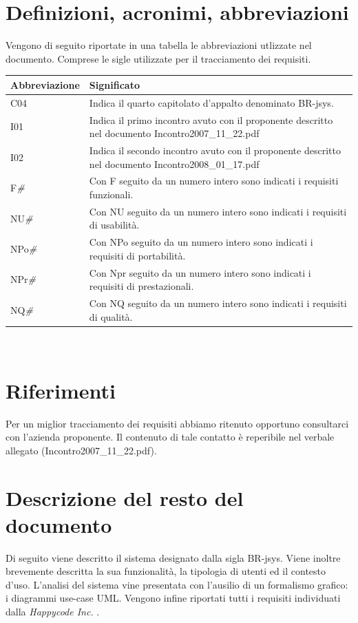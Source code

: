 \documentclass[11pt,titlepage,a4paper]{report}
\begin{document}
\section{Definizioni, acronimi, abbreviazioni}
Vengono di seguito riportate in una tabella le abbreviazioni utlizzate nel documento. Comprese le sigle utilizzate per il tracciamento dei requisiti.
\begin{center}
\begin{tabular}{||p{3.5cm}||p{9.5cm}||} \hline
\textbf{Abbreviazione} & \textbf{Significato} \\ \hline
C04 & Indica il quarto capitolato d'appalto denominato BR-jsys.\\ \hline
I01 & Indica il primo incontro avuto con il proponente descritto nel documento Incontro2007\_11\_22.pdf\\ \hline
I02 & Indica il secondo incontro avuto con il proponente descritto nel documento Incontro2008\_01\_17.pdf\\ \hline
F\textit{\#} & Con F seguito da un numero intero sono indicati i requisiti funzionali.\\ \hline
NU\textit{\#} & Con NU seguito da un numero intero sono indicati i requisiti di usabilit\`a.\\ \hline
NPo\textit{\#} & Con NPo seguito da un numero intero sono indicati i requisiti di portabilit\`a.\\ \hline
NPr\textit{\#} & Con Npr seguito da un numero intero sono indicati i requisiti di prestazionali.\\ \hline
NQ\textit{\#} & Con NQ seguito da un numero intero sono indicati i requisiti di qualit\`a.\\ \hline

\end{tabular} \\
\end{center}

\section{Riferimenti}
Per un miglior tracciamento dei requisiti abbiamo ritenuto opportuno consultarci con l'azienda proponente. Il contenuto di tale contatto \`e reperibile nel verbale allegato (Incontro2007\_11\_22.pdf).
\section{Descrizione del resto del documento}
Di seguito viene descritto il sistema designato dalla sigla BR-jsys. Viene inoltre brevemente descritta la sua funzionalit\`a, la tipologia di utenti ed il contesto d'uso. L'analisi del sistema vine presentata con l'ausilio di un formalismo grafico: i diagrammi use-case UML. Vengono infine riportati tutti i requisiti individuati dalla \textit{Happycode Inc.} .
\end{document}
